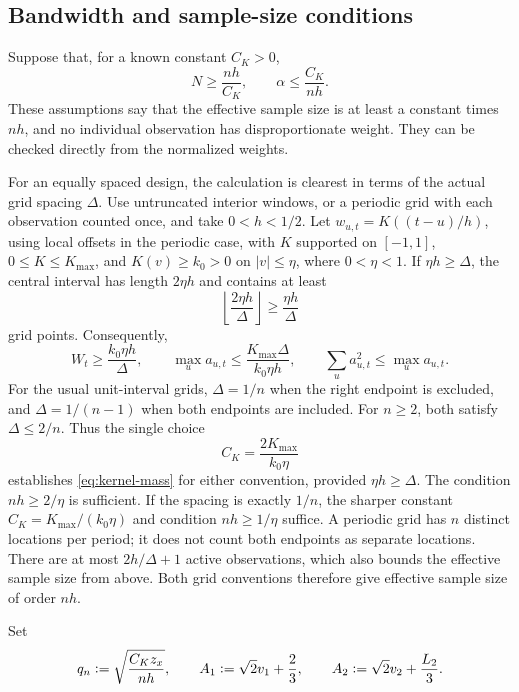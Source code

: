 \documentclass[11pt]{article}
\newcommand{\eqdef}{\mathrel{\vcentcolon=}}
\begin{document}
\subsection{Bandwidth and sample-size conditions}\label{sec:bandwidth}

Suppose that, for a known constant \(C_K>0\),
\begin{equation}
  N\geq\frac{nh}{C_K},\qquad \alpha\leq\frac{C_K}{nh}.
  \label{eq:kernel-mass}
\end{equation}
These assumptions say that the effective sample size is at least a constant
times \(nh\), and no individual observation has disproportionate weight.
They can be checked directly from the normalized weights.

For an equally spaced design, the calculation is clearest in terms of the
actual grid spacing \(\Delta\).  Use untruncated interior windows, or a
periodic grid with each observation counted once, and take \(0<h<1/2\).
Let \(w_{u,t}=K((t-u)/h)\), using local offsets in the periodic case, with
\(K\) supported on \([-1,1]\), \(0\leq K\leq K_{\max}\), and
\(K(v)\geq k_0>0\) on \(|v|\leq\eta\), where \(0<\eta<1\).
If \(\eta h\geq\Delta\), the central interval has length \(2\eta h\) and
contains at least
\[
  \left\lfloor\frac{2\eta h}{\Delta}\right\rfloor
  \geq\frac{\eta h}{\Delta}
\]
grid points.  Consequently,
\[
  W_t\geq\frac{k_0\eta h}{\Delta},\qquad
  \max_u a_{u,t}\leq\frac{K_{\max}\Delta}{k_0\eta h},\qquad
  \sum_u a_{u,t}^2\leq\max_u a_{u,t}.
\]
For the usual unit-interval grids, \(\Delta=1/n\) when the right endpoint is
excluded, and \(\Delta=1/(n-1)\) when both endpoints are included.  For
\(n\geq2\), both satisfy \(\Delta\leq2/n\).  Thus the single choice
\[
  C_K=\frac{2K_{\max}}{k_0\eta}
\]
establishes \eqref{eq:kernel-mass} for either convention, provided
\(\eta h\geq\Delta\).  The condition \(nh\geq2/\eta\) is sufficient.
If the spacing is exactly \(1/n\), the sharper constant
\(C_K=K_{\max}/(k_0\eta)\) and condition \(nh\geq1/\eta\) suffice.
A periodic grid has \(n\) distinct locations per period; it does not count
both endpoints as separate locations.  There are at most \(2h/\Delta+1\)
active observations, which also bounds the effective sample size from above.
Both grid conventions therefore give effective sample size of order \(nh\).

Set
\begin{equation}
  q_n\eqdef\sqrt{\frac{C_Kz_x}{nh}},\qquad
  A_1\eqdef\sqrt2v_1+\frac23,\qquad
  A_2\eqdef\sqrt2v_2+\frac{L_2}{3}.
  \label{eq:rate-constants}
\end{equation}
\end{document}

